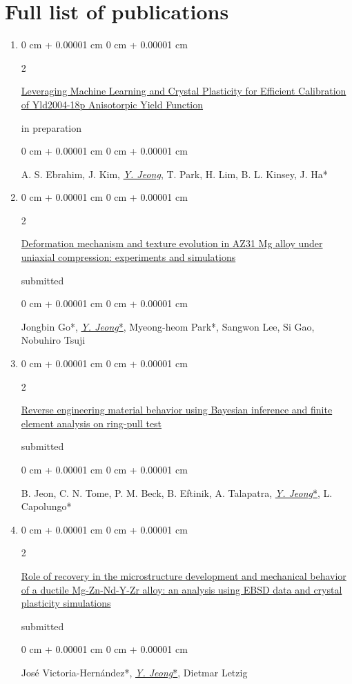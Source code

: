 \documentclass[10pt, letterpaper]{article}
\newenvironment{onecolentry}{
    \begin{adjustwidth}{
        0 cm + 0.00001 cm
    }{
        0 cm + 0.00001 cm
    }
}{
    \end{adjustwidth}
} %
\newenvironment{twocolentry}[2][]{
    \onecolentry
    \def\secondColumn{#2}
    \setcolumnwidth{\fill, 4.5 cm}
    \begin{paracol}{2}
}{
    \switchcolumn \raggedleft \secondColumn
    \end{paracol}
    \endonecolentry
} %
\begin{document}
        \section{Full list of publications}
        \begin{enumerate}


        \item
          \begin{twocolentry}{in preparation}
            \href{}{Leveraging Machine Learning and Crystal Plasticity for Efficient Calibration of Yld2004-18p Anisotorpic Yield Function}
          \end{twocolentry}
          \begin{onecolentry}
            A. S. Ebrahim,  J. Kim, {\underline{\textit{Y. Jeong}}}, T. Park, H. Lim, B. L. Kinsey, J. Ha*
          \end{onecolentry}
          \vspace{0.10 cm}


        \item
          \begin{twocolentry}{submitted}
            \href{}{Deformation mechanism and texture evolution in AZ31 Mg alloy under uniaxial compression: experiments and simulations}
          \end{twocolentry}
          \begin{onecolentry}
            Jongbin Go*,  {\underline{\textit{Y. Jeong}*}}, Myeong-heom Park*, Sangwon Lee, Si Gao, Nobuhiro Tsuji
          \end{onecolentry}
          \vspace{0.10 cm}

        \item
          \begin{twocolentry}{submitted}
            \href{}{Reverse engineering material behavior using Bayesian inference and finite element analysis on ring-pull test}
          \end{twocolentry}
          \begin{onecolentry}
            B. Jeon, C. N. Tome, P. M. Beck, B. Eftinik, A. Talapatra, {\underline{\textit{Y. Jeong}*}}, L. Capolungo*
          \end{onecolentry}
          \vspace{0.10 cm}



        \item
          \begin{twocolentry}{submitted}
            \href{}{Role of recovery in the microstructure development and mechanical behavior of a ductile Mg-Zn-Nd-Y-Zr alloy: an analysis using EBSD data and crystal plasticity simulations}
        \end{twocolentry}
        \begin{onecolentry}
            José Victoria-Hernández*, {\underline{\textit{Y. Jeong}*}}, Dietmar Letzig
        \end{onecolentry}
        \vspace{0.10 cm}



\end{enumerate}
\end{document}
